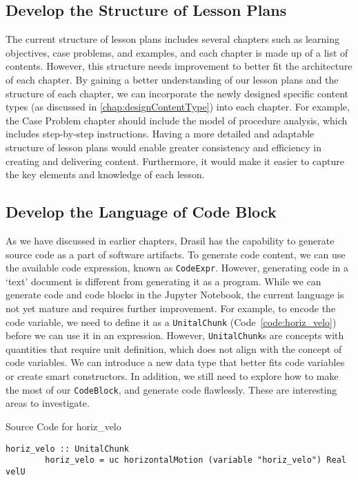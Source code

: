 \subsection{Develop the Structure of Lesson Plans} 
\label{chap:developlsnPlanStruc}
The current structure of lesson plans includes several chapters such as 
learning objectives, case problems, and examples, and each chapter is made up 
of a list of contents. However, this structure needs improvement to better fit 
the architecture of each chapter. By gaining a better understanding of our 
lesson plans and the structure of each chapter, we can incorporate the newly 
designed specific content types (as discussed in \ref{chap:designContentType}) 
into each chapter. For example, the Case Problem chapter should include the 
model of procedure analysis, which includes step-by-step instructions. Having a 
more detailed and adaptable structure of lesson plans would enable greater 
consistency and efficiency in creating and delivering content. Furthermore, it 
would make it easier to capture the key elements and knowledge of each lesson.

\subsection{Develop the Language of Code Block}
As we have discussed in earlier chapters, Drasil has the capability to generate 
source code as a part of software artifacts. To generate code content, we can 
use the available code expression, known as \texttt{CodeExpr}. However, 
generating code in a `text' document is different from generating it as a 
program. While we can generate code and code blocks in the Jupyter Notebook, 
the current language is not yet mature and requires further improvement. For 
example, to encode the code variable, we need to define it as a 
\texttt{UnitalChunk} (Code~\ref{code:horiz_velo}) before we can use it in an 
expression. However, \texttt{UnitalChunk}s are concepts with quantities that 
require unit definition, which does not align with the concept of code 
variables. We can introduce a new data type that better fits code variables or 
create smart constructors. In addition, we still need to explore how to make 
the most of our \texttt{CodeBlock}, and generate code flawlessly. These are 
interesting areas to investigate.

\begin{listing}[h!]
	\caption{Source Code for horiz\_velo}
	\label{code:horiz_velo}
	\begin{lstlisting}[language=haskell1]
		horiz_velo :: UnitalChunk
		horiz_velo = uc horizontalMotion (variable "horiz_velo") Real velU 
	\end{lstlisting}
\end{listing}

